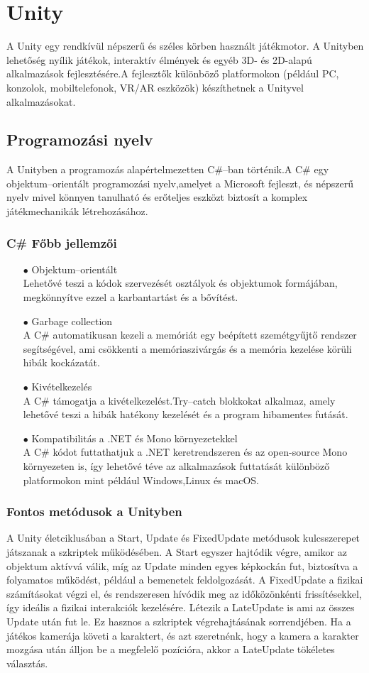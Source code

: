 \documentclass[
]{thesis-ekf}
\theoremstyle{definition}
\theoremstyle{remark}
\begin{document}
\section{Unity}
\label{sec:Unity}
A Unity egy rendkívül népszerű és széles körben használt játékmotor. A Unityben lehetőség nyílik játékok, interaktív élmények és egyéb 3D- és 2D-alapú alkalmazások fejlesztésére.A fejlesztők különböző platformokon (például PC, konzolok, mobiltelefonok, VR/AR eszközök) készíthetnek a Unityvel alkalmazásokat.
\subsection{Programozási nyelv}
A Unityben a programozás alapértelmezetten  C\#--ban történik.A C\# egy objektum--orientált programozási nyelv,amelyet a Microsoft fejleszt, és népszerű nyelv mivel könnyen tanulható és erőteljes eszközt biztosít a komplex játékmechanikák létrehozásához.\cite{Csharp}
\subsubsection{C\# Főbb jellemzői}
\begin{itemize}
	\item[$\bullet$]Objektum--orientált \\Lehetővé teszi a kódok szervezését osztályok és objektumok formájában, megkönnyítve ezzel a karbantartást és a bővítést.
	\item[$\bullet$]Garbage collection\\A C\# automatikusan kezeli a memóriát egy beépített szemétgyűjtő rendszer segítségével, ami csökkenti a memóriaszivárgás és a memória kezelése körüli hibák kockázatát.
	\item[$\bullet$]Kivételkezelés\\A C\# támogatja a kivételkezelést.Try--catch blokkokat alkalmaz, amely lehetővé teszi a hibák hatékony kezelését és a program hibamentes futását.
	\item[$\bullet$]Kompatibilitás a .NET és Mono környezetekkel\\A C\# kódot futtathatjuk a .NET keretrendszeren és az open-source Mono környezeten is, így lehetővé téve az alkalmazások futtatását különböző platformokon mint például Windows,Linux és macOS.
\end{itemize}
\subsubsection{Fontos metódusok a Unityben}
A Unity életciklusában a Start, Update és FixedUpdate metódusok kulcsszerepet játszanak a szkriptek működésében. A Start egyszer hajtódik végre, amikor az objektum aktívvá válik, míg az Update minden egyes képkockán fut, biztosítva a folyamatos működést, például a bemenetek feldolgozását. A FixedUpdate a fizikai számításokat végzi el, és rendszeresen hívódik meg az időközönkénti frissítésekkel, így ideális a fizikai interakciók kezelésére.\cite{UnityEvents} Létezik a LateUpdate is ami az összes Update után fut le. Ez hasznos a szkriptek végrehajtásának sorrendjében. Ha a játékos kamerája követi a karaktert, és azt szeretnénk, hogy a kamera a karakter mozgása után álljon be a megfelelő pozícióra, akkor a LateUpdate tökéletes választás.\cite{UnityLateUpdate}
\end{document}
